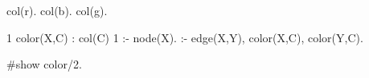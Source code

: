 col(r).   col(b).   col(g).

1 { color(X,C) : col(C) } 1 :- node(X).
:- edge(X,Y), color(X,C), color(Y,C).

#show color/2.

